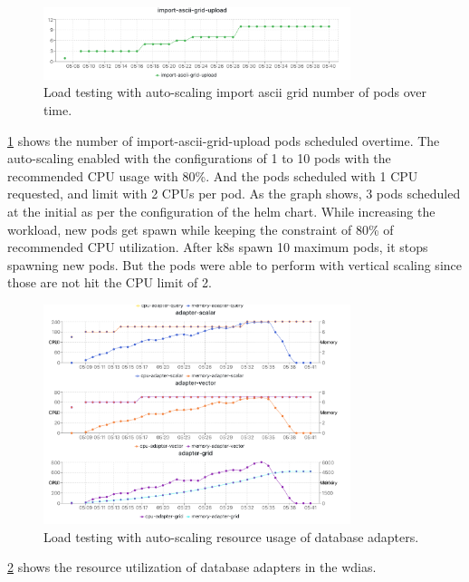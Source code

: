 \begin{figure}[htp]
    \centering
    \includegraphics[width=0.8\textwidth]{results/obs/all_auto/obs_all_auto_15m_import_grid_pod.png}
    \caption{Load testing with auto-scaling import ascii grid number of pods over time.}
    \label{fi:obs_all_auto_15m_import_grid_pod}
\end{figure}

\cref{fi:obs_all_auto_15m_import_grid_pod} shows the number of import-ascii-grid-upload pods scheduled overtime. The auto-scaling enabled with the configurations of 1 to 10 pods with the recommended CPU usage with 80\%. And the pods scheduled with 1 CPU requested, and limit with 2 CPUs per pod.
As the graph shows, 3 pods scheduled at the initial as per the configuration of the helm chart. While increasing the workload, new pods get spawn while keeping the constraint of 80\% of recommended CPU utilization. After \acrshort{k8s} spawn 10 maximum pods, it stops spawning new pods. But the pods were able to perform with vertical scaling since those are not hit the CPU limit of 2.

\begin{figure}[htp]
    \centering
    \includegraphics[width=0.8\textwidth]{results/obs/all_auto/obs_all_auto_15m_adapter_dbs_res.png}
    \caption{Load testing with auto-scaling resource usage of database adapters.}
    \label{fi:obs_all_auto_15m_adapter_dbs_res}
\end{figure}
\cref{fi:obs_all_auto_15m_adapter_dbs_res} shows the resource utilization of database adapters in the \acrshort{wdias}.


